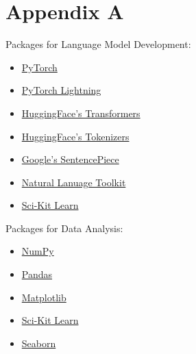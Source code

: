 \documentclass{article}
\begin{document}
    \newpage
    \section{Appendix A}
        Packages for Language Model Development:
        \begin{multicols}{2}
            \begin{itemize}
                \item \href{https://pytorch.org}{PyTorch}
                \item \href{https://www.pytorchlightning.ai}{PyTorch Lightning}
                \item \href{https://github.com/huggingface/transformers}{HuggingFace's Transformers}
                \item \href{https://github.com/huggingface/tokenizers}{HuggingFace's Tokenizers}
                \item \href{https://github.com/google/sentencepiece}{Google's SentencePiece}
                \item \href{https://www.nltk.org}{Natural Lanuage Toolkit}
                \item \href{https://scikit-learn.org}{Sci-Kit Learn}
            \end{itemize}
        \end{multicols}

        Packages for Data Analysis:
        \begin{itemize}
            \item \href{https://numpy.org}{NumPy}
            \item \href{https://pandas.pydata.org}{Pandas}
            \item \href{https://matplotlib.org}{Matplotlib}
            \item \href{https://scikit-learn.org}{Sci-Kit Learn}
            \item \href{https://seaborn.pydata.org}{Seaborn}
        \end{itemize}

    \newpage
    
    
\end{document}

